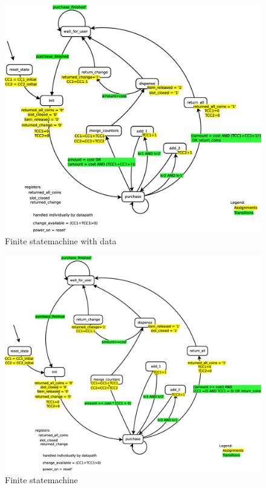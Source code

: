\label{app:figures}


\begin{figure}
\centering
\includegraphics[width=1.0\textwidth]{fig/FSMD.eps}
\caption{Finite statemachine with data}
\label{fig:fsmd}
\end{figure}

\begin{figure}
\centering
\includegraphics[width=1.0\textwidth]{fig/FSM.eps}
\caption{Finite statemachine}
\label{fig:fsm}
\end{figure}

